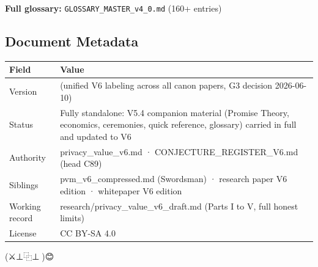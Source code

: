 \documentclass[
  11pt,
]{article}
\newcounter{none} %
\begin{document}
\textbf{Full glossary:} \texttt{GLOSSARY\_MASTER\_v4\_0.md} (160+
entries)

\subsection{Document Metadata}\label{document-metadata}

{\def\LTcaptype{none} %
\begin{longtable}[]{@{}
  >{\raggedright\arraybackslash}p{}
  >{\raggedright\arraybackslash}p{}@{}}
\toprule\noalign{}
\begin{minipage}[b]{\linewidth}\raggedright
Field
\end{minipage} & \begin{minipage}[b]{\linewidth}\raggedright
Value
\end{minipage} \\
\midrule\noalign{}
\endhead
\bottomrule\noalign{}
\endlastfoot
Version & 6.0 (unified V6 labeling across all canon papers, G3 decision
2026-06-10) \\
Status & Fully standalone: V5.4 companion material (Promise Theory,
economics, ceremonies, quick reference, glossary) carried in full and
updated to V6 \\
Authority & privacy\_value\_v6.md · CONJECTURE\_REGISTER\_V6.md (head
C89) \\
Siblings & pvm\_v6\_compressed.md (Swordsman) · research paper V6
edition · whitepaper V6 edition \\
Working record & research/privacy\_value\_v6\_draft.md (Parts I to V,
full honest limits) \\
License & CC BY-SA 4.0 \\
\end{longtable}
}

(⚔️⊥⿻⊥🧙)😊
\end{document}
